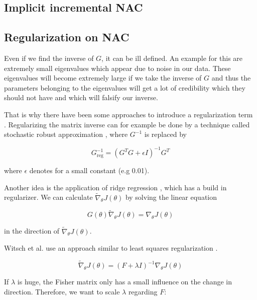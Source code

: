 \subsection{Implicit incremental NAC}



\subsection{Regularization on NAC}
	Even if we find the inverse of $G$, it can be ill defined. An example for this are extremely small eigenvalues which appear due to noise in our data. These eigenvalues will become extremely large if we take the inverse of $G$ and thus the parameters belonging to the eigenvalues will get a lot of credibility which they should not have and which will falsify our inverse.
	
	That is why there have been some approaches to introduce a regularization term \cite{sohl2012natural}. Regularizing the matrix inverse can for example be done by a technique called stochastic robust approximation \cite{boyd2004convex}, where $G^{-1}$ is replaced by 
	
	\begin{equation}
		G^{-1}_{\text{reg}} = \left( G^T G + \epsilon I \right)^{-1} G^T
	\end{equation}
	
	\noindent where $\epsilon$ denotes for a small constant (e.g 0.01).
	
	Another idea is the application of ridge regression \cite{hoerl1970ridge}, which has a build in regularizer. We can calculate $\widetilde{\nabla}_{\theta} J(\theta)$ by solving the linear equation
	
	\begin{equation}
		G(\theta) \widetilde{\nabla}_{\theta} J(\theta) = \nabla_{\theta} J(\theta)
	\end{equation}
	
	\noindent in the direction of $\widetilde{\nabla}_{\theta} J(\theta)$.
	
	Witsch et al. use an approach similar to least squares regularization \cite{witsch2011enhancing}. 
	
	\begin{equation}
		\widetilde{\nabla}_{\theta} J(\theta) = \left( F + \lambda I \right)^{-1} \nabla_\theta J(\theta)
	\end{equation}
	
	\noindent If $\lambda$ is huge, the Fisher matrix only has a small influence on the change in direction. Therefore, we want to scale $\lambda$ regarding $F$:
	
